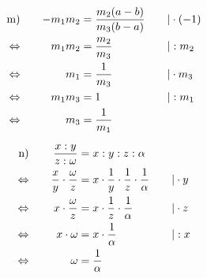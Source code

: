 \begin{exercise}
    \begin{minipage}[t]{0.47\linewidth}
      \makeatletter\@fleqntrue\makeatother
      \begin{alignat*}{3}
        \text{m)}&\quad
        &
        -m_{1}m_{2}&=\frac{m_{2}(a-b)}{m_{3}(b-a)}
        &
        \quad&|\cdot(-1)
        \\
        \Leftrightarrow&\quad
        &
        m_{1}m_{2}&=\frac{m_{2}}{m_{3}}
        &
        \quad&|:m_{2}
        \\
        \Leftrightarrow&\quad
        &
        m_{1}&=\frac{1}{m_{3}}
        &
        \quad&|\cdot m_{3}
        \\
        \Leftrightarrow&\quad
        &
        m_{1}m_{3}&=1
        &
        \quad&|:m_{1}
        \\
        \Leftrightarrow&\quad
        &
        m_{3}&=\frac{1}{m_{1}}
        &
        \quad&\relax
      \end{alignat*}
    \end{minipage}\hfill
    \begin{minipage}[t]{0.51\linewidth}
      \makeatletter\@fleqntrue\makeatother
      \begin{alignat*}{3}
        \text{n)}&\quad
        &
        \frac{x:y}{z:\omega}&=x:y:z:\alpha
        &
        \quad&\relax
        \\
        \Leftrightarrow&\quad
        &
        \frac{x}{y}\cdot\frac{\omega}{z}&=x\cdot\frac{1}{y}\cdot\frac{1}{z}\cdot\frac{1}{\alpha}
        &
        \quad&|\cdot y
        \\
        \Leftrightarrow&\quad
        &
        x\cdot\frac{\omega}{z}&=x\cdot\frac{1}{z}\cdot\frac{1}{\alpha}
        &
        \quad&|\cdot z
        \\
        \Leftrightarrow&\quad
        &
        x\cdot\omega&=x\cdot\frac{1}{\alpha}
        &
        \quad&|:x
        \\
        \Leftrightarrow&\quad
        &
        \omega&=\frac{1}{\alpha}
        &
        \quad&\relax
      \end{alignat*}
    \end{minipage}\par
  \fi
\end{exercise}
